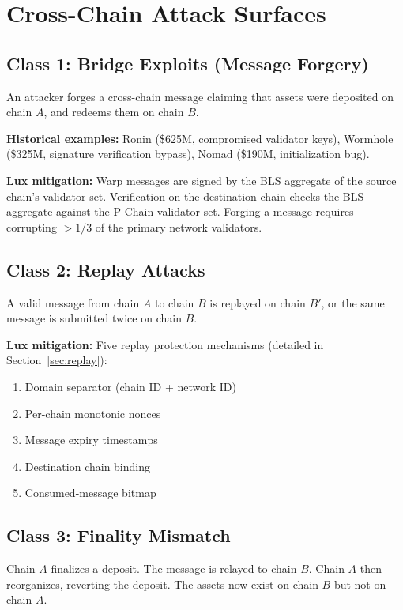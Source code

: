 \section{Cross-Chain Attack Surfaces}


\subsection{Class 1: Bridge Exploits (Message Forgery)}

An attacker forges a cross-chain message claiming that assets were deposited on chain $A$, and redeems them on chain $B$.

\textbf{Historical examples:} Ronin (\$625M, compromised validator keys), Wormhole (\$325M, signature verification bypass), Nomad (\$190M, initialization bug).

\textbf{Lux mitigation:} Warp messages are signed by the BLS aggregate of the source chain's validator set. Verification on the destination chain checks the BLS aggregate against the P-Chain validator set. Forging a message requires corrupting $>1/3$ of the primary network validators.

\subsection{Class 2: Replay Attacks}

A valid message from chain $A$ to chain $B$ is replayed on chain $B'$, or the same message is submitted twice on chain $B$.

\textbf{Lux mitigation:} Five replay protection mechanisms (detailed in Section~\ref{sec:replay}):
\begin{enumerate}[leftmargin=2em]
\item Domain separator (chain ID + network ID)
\item Per-chain monotonic nonces
\item Message expiry timestamps
\item Destination chain binding
\item Consumed-message bitmap
\end{enumerate}

\subsection{Class 3: Finality Mismatch}

Chain $A$ finalizes a deposit. The message is relayed to chain $B$. Chain $A$ then reorganizes, reverting the deposit. The assets now exist on chain $B$ but not on chain $A$.

